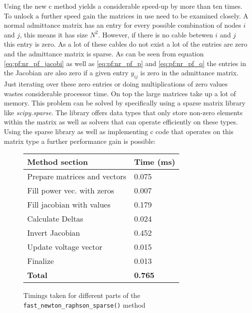 Using the new c method yields a considerable speed-up by more than ten times.\\

To unlock a further speed gain the matrices in use need to be examined closely. A normal admittance matrix has 
an entry for every possible combination of nodes $i$ and $j$, this means it has size $N^2$. However, if there is
no cable betewen $i$ and $j$ this entry is zero. As a lot of these cables do not exist a lot of the entries are zero
and the admittance matrix is sparse.
As can be seen from equation \ref{eq:pf:nr_pf_jacobi} as well as \ref{eq:pf:nr_pf_p} and \ref{eq:pf:nr_pf_q} the entries
in the Jacobian are also zero if a given entry $y_{ij}$ is zero in the admittance matrix.\\
Just iterating over these zero entries or doing multiplications of zero values wastes considerable processor time. On top
the large matrices take up a lot of memory. This problem can be solved by specifically using
a sparse matrix library like \textit{scipy.sparse}\autocite{2020SciPy-NMeth}. The library offers
data types that only store non-zero elements within the matrix as well as solvers that can operate
efficiently on these types.\\
Using the sparse library as well as implementing c code that operates on this matrix type a
further performance gain is possible:

\begin{figure}[H]
    \begin{center}
        \begin{tabular}{ll}
            \textbf{Method section} & \textbf{Time (ms)}\\
            \hline
            Prepare matrices and vectors & 0.075\\
            Fill power vec. with zeros &  0.007\\
            Fill jacobian with values & 0.179\\
            Calculate Deltas &      0.024\\
            Invert Jacobian &      0.452\\
            Update voltage vector & 0.015\\
            Finalize & 0.013\\
            \hline
            \textbf{Total} & \textbf{0.765}
        \end{tabular}
    \end{center}
\caption{Timings taken for different parts of the \texttt{fast\_newton\_raphson\_sparse()} method}
\end{figure}

